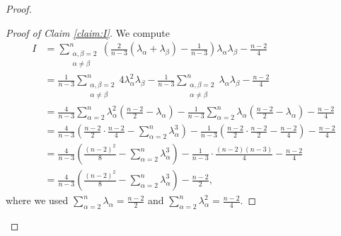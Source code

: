 \documentclass[10pt,a4paper]{amsart}
\begin{document}
\begin{proof}
	\begin{proof}[Proof of Claim \ref{claim:I}]
		We compute
	\begin{equation*}
	\begin{aligned}
			I &= \sum_{\substack{\alpha,\beta=2 \\ \alpha\neq\beta}}^n \left(\frac{2}{n-3}(\lambda_{\alpha} + \lambda_{\beta}) - \frac{1}{n-3}\right)\lambda_{\alpha}\lambda_{\beta} - \frac{n-2}{4} \\
			&= \frac{1}{n-3}\sum_{\substack{\alpha,\beta=2 \\ \alpha\neq\beta}}^n 4\lambda_\alpha^2 \lambda_\beta - \frac{1}{n-3}\sum_{\substack{\alpha,\beta=2 \\ \alpha\neq\beta}}^n \lambda_\alpha\lambda_\beta - \frac{n-2}{4} \\
			&= \frac{4}{n-3}\sum_{\alpha=2}^n \lambda_\alpha^2\left(\frac{n-2}{2} - \lambda_\alpha\right) - \frac{1}{n-3}\sum_{\alpha=2}^n\lambda_\alpha\left(\frac{n-2}{2} - \lambda_\alpha\right) - \frac{n-2}{4} \\
			&= \frac{4}{n-3}\left(\frac{n-2}{2} \cdot \frac{n-2}{4} - \sum_{\alpha=2}^n \lambda_\alpha^3\right) - \frac{1}{n-3}\left(\frac{n-2}{2} \cdot \frac{n-2}{2} - \frac{n-2}{4}\right) - \frac{n-2}{4} \\
			&= \frac{4}{n-3}\left(\frac{(n-2)^2}{8} - \sum_{\alpha=2}^n \lambda_\alpha^3\right) - \frac{1}{n-3} \cdot \frac{(n-2)(n-3)}{4} - \frac{n-2}{4} \\
			&= \frac{4}{n-3}\left(\frac{(n-2)^2}{8} - \sum_{\alpha=2}^n \lambda_\alpha^3\right) - \frac{n-2}{2},
		\end{aligned}
		\end{equation*}
		where we used $\sum_{\alpha=2}^n \lambda_\alpha = \frac{n-2}{2}$ and $\sum_{\alpha=2}^n \lambda_\alpha^2 = \frac{n-2}{4}$.
		

\end{proof}
\end{proof}
\end{document}
